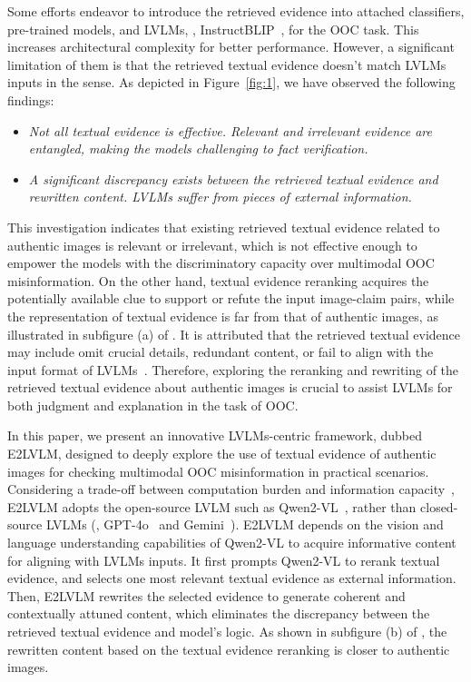 Some efforts \cite{abdelnabi2022open, qi2024sniffer, tahmasebi2024multimodal} endeavor to introduce the retrieved evidence into attached classifiers, pre-trained models, and LVLMs, \eg, InstructBLIP~\cite{dai2023instructblip}, for the OOC task. This increases architectural complexity for better performance. However, a significant limitation of them is that the retrieved textual evidence doesn't match LVLMs inputs in the sense. As depicted in Figure~\ref{fig:1}, we have observed the following findings:
\begin{itemize}
    \item \textit{Not all textual evidence is effective. Relevant and irrelevant evidence are entangled, making the models challenging to fact verification.}
    \item \textit{A significant discrepancy exists between the retrieved textual evidence and rewritten content. LVLMs suffer from pieces of external information.}
\end{itemize}
This investigation indicates that existing retrieved textual evidence related to authentic images is relevant or irrelevant, which is not effective enough to empower the models with the discriminatory capacity over multimodal OOC misinformation. On the other hand, textual evidence reranking acquires the potentially available clue to support or refute the input image-claim pairs, while the representation of textual evidence is far from that of authentic images, as illustrated in subfigure (a) of . It is attributed that the retrieved textual evidence may include omit crucial details, redundant content, or fail to align with the input format of LVLMs~\cite{wu2024cotkr}. Therefore, exploring the reranking and rewriting of the retrieved textual evidence about authentic images is crucial to assist LVLMs for both judgment and explanation in the task of OOC.

In this paper, we present an innovative LVLMs-centric framework, dubbed E2LVLM, designed to deeply explore the use of textual evidence of authentic images for checking multimodal OOC misinformation in practical scenarios. Considering a trade-off between computation burden and information capacity~\cite{yin2023survey}, E2LVLM adopts the open-source LVLM such as Qwen2-VL~\cite{wang2024qwen2}, rather than closed-source LVLMs (\eg, GPT-4o~\cite{hurst2024gpt} and Gemini~\cite{team2023gemini}). E2LVLM depends on the vision and language understanding capabilities of Qwen2-VL to acquire informative content for aligning with LVLMs inputs. It first prompts Qwen2-VL to rerank textual evidence, and selects one most relevant textual evidence as external information. Then, E2LVLM rewrites the selected evidence to generate coherent and contextually attuned content, which eliminates the discrepancy between the retrieved textual evidence and model's logic. As shown in subfigure (b) of , the rewritten content based on the textual evidence reranking is closer to authentic images.

